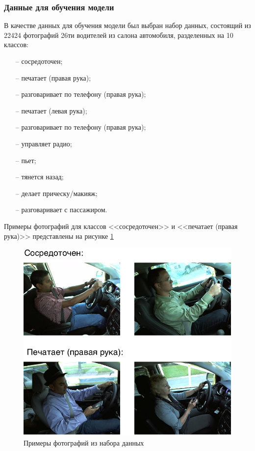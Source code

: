 \subsubsection{Данные для обучения модели}
В качестве данных для обучения модели был выбран набор данных\cite{state-farm-distracted-driver-detection}, состоящий из 22424 фотографий 26ти водителей из салона автомобиля, разделенных на 10 классов:
\begin{itemize}[leftmargin=1.6\parindent]
	\item[--] сосредоточен;
	\item[--] печатает (правая рука);
	\item[--] разговаривает по телефону (правая рука);
	\item[--] печатает (левая рука);
	\item[--] разговаривает по телефону (правая рука);
	\item[--] управляет радио;
	\item[--] пьет;
	\item[--] тянется назад;
	\item[--] делает прическу/макияж;
	\item[--] разговаривает с пассажиром.
\end{itemize}

Примеры фотографий для классов <<сосредоточен>> и  <<печатает (правая рука)>> представлены на рисунке \ref{fig:classes_example}

\begin{figure}[hbtp]
	\centering
	\includegraphics[scale=0.9]{img/classes_example.pdf}
	\caption{Примеры фотографий из набора данных}
	\label{fig:classes_example}
\end{figure}
\clearpage

